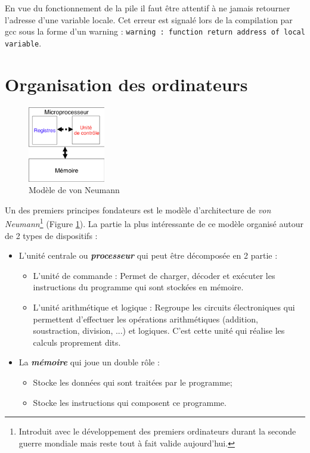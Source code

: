 En vue du fonctionnement de la pile il faut être attentif à ne jamais retourner l'adresse d'une variable locale.
Cet erreur est signalé lors de la compilation par gcc sous la forme d'un warning : \texttt{warning : function return address of local variable}.


\section{Organisation des ordinateurs}
\begin{figure}
  \vspace{-0.5cm}
  \includegraphics[width=0.3\textwidth]{vanNeumann}
  \caption{\label{fig:vanNeumann}Modèle de von Neumann}
\end{figure}

Un des premiers principes fondateurs est le modèle d'architecture de \textit{von Neumann}\footnote{Introduit avec le développement des premiers ordinateurs durant la seconde guerre mondiale mais reste tout à fait valide aujourd'hui.} (Figure \ref{fig:vanNeumann}).
La partie la plus intéressante de ce modèle organisé autour de 2 types de dispositifs :
\begin{itemize}
  \item L'unité centrale ou \textbf{\textit{processeur}} qui peut être décomposée en 2 partie :
    \begin{itemize}
      \item L'unité de commande : Permet de charger, décoder et exécuter les instructions du programme qui sont stockées en mémoire.
      \item L'unité arithmétique et logique : Regroupe les circuits électroniques qui permettent d'effectuer les opérations arithmétiques (addition, soustraction, division, ...) et logiques.
        C'est cette unité qui réalise les calculs proprement dits.
    \end{itemize}
  \item La \textbf{\textit{mémoire}} qui joue un double rôle :
    \begin{itemize}
      \item Stocke les données qui sont traitées par le programme;
      \item Stocke les instructions qui composent ce programme.
    \end{itemize}
\end{itemize}


